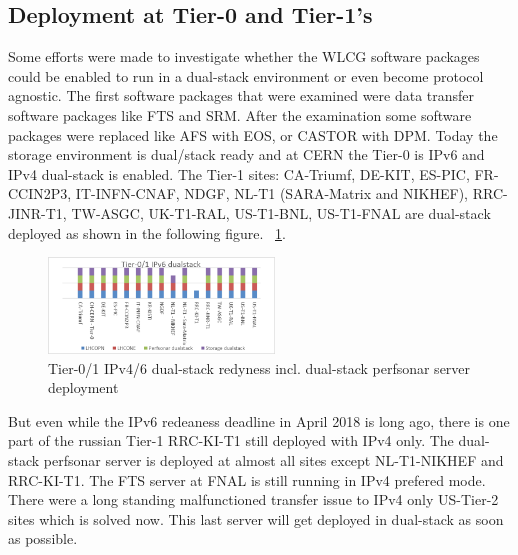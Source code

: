 
%

\subsection{Deployment at Tier-0 and Tier-1's}
Some efforts were made to investigate whether the WLCG software packages could be enabled to run in a dual-stack environment or even become protocol agnostic. The first software packages that were examined were data transfer software packages like FTS and SRM. After the examination some software packages were replaced like AFS with EOS, or CASTOR with DPM. Today the storage environment is dual/stack ready and at CERN the Tier-0 is IPv6 and IPv4 dual-stack is enabled. The Tier-1 sites: CA-Triumf, DE-KIT, ES-PIC, FR-CCIN2P3, IT-INFN-CNAF, NDGF, NL-T1 (SARA-Matrix and NIKHEF), RRC-JINR-T1, TW-ASGC, UK-T1-RAL, US-T1-BNL, US-T1-FNAL are dual-stack deployed as shown in the following figure. ~\ref{fig:t1ds}.
\begin{figure}[h]
\centering
\includegraphics[width=6cm]{hepix-ipv6-tier01-dual-stack}
\caption{Tier-0/1 IPv4/6 dual-stack redyness incl. dual-stack perfsonar server deployment}
\label{fig:t1ds}
\end{figure}
But even while the IPv6 redeaness deadline in April 2018 is long ago, there is one part of the russian Tier-1 RRC-KI-T1 still deployed with IPv4 only. The dual-stack perfsonar server is deployed at almost all sites except NL-T1-NIKHEF and RRC-KI-T1. The FTS server at FNAL is still running in IPv4 prefered mode. There were a long standing malfunctioned transfer issue to IPv4 only US-Tier-2 sites which is solved now. This last server will get deployed in dual-stack as soon as possible.
